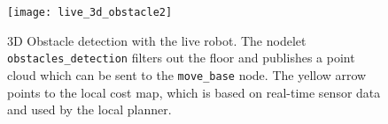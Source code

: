 \begin{figure}[h]
	\centering
	\texttt{[image: live\_3d\_obstacle2]}
	\caption{3D Obstacle detection with the live robot. The nodelet \texttt{obstacles\_detection} filters out the floor and publishes a point cloud which can be sent to the \texttt{move\_base} node. The yellow arrow points to the local cost map, which is based on real-time sensor data and used by the local planner.}
	\label{fig:live_3d_obstacle2}
\end{figure}
